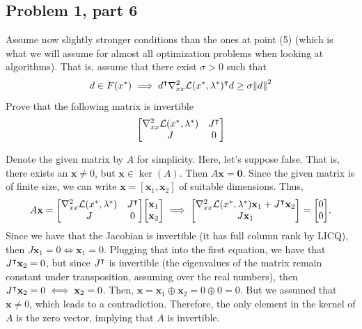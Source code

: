 \subsection{Problem 1, part 6}
Assume now slightly stronger conditions than the ones at point (5) (which is what we will assume for almost all optimization problems when looking at algorithms). That is, assume that there exist $\sigma > 0$ such that
\[d \in F(x^{*}) \implies d^{\intercal} \nabla^2_{xx}\mathcal{L}(x^{*}, \mathrm{\lambda}^{*})^{\intercal} d \geq \sigma\norm{d}^2\]
Prove that the following matrix is invertible
\[\mqty[\grad^2_{xx}\scL(x\star, \lm\star) &J\T\\ J&0]\]
\partbreak
\begin{solution}

    Denote the given matrix by $A$ for simplicity. Here, let's suppose false. That is, there exists an $\textbf{x} \neq 0$, but $\textbf{x} \in \ker (A)$. Then $A\textbf{x} = \textbf{0}$. Since the given matrix is of finite size, we can write $\textbf{x} = [\textbf{x}_1, \textbf{x}_2]$ of suitable dimensions. Thus, 
    \[A\textbf{x} = \mqty[\grad^2_{xx}\scL(x\star, \lm\star) &J\T\\ J&0]\mqty[\textbf{x}_1\\\textbf{x}_2] \implies \mqty[\grad^2_{xx}\scL(x\star, \lm\star)\textbf{x}_1 + J\T \textbf{x}_2\\ J\textbf{x}_1] = \mqty[0\\0].\]
    Since we have that the Jacobian is invertible (it has full column rank by LICQ), then $J\textbf{x}_1 = 0 \iff \textbf{x}_1 = 0$. Plugging that into the first equation, we have that $J^{\intercal} \textbf{x}_2 = 0$, but since $J^{\intercal}$ is invertible (the eigenvalues of the matrix remain constant under transposition, assuming over the real numbers), then $J^{\intercal} \textbf{x}_2 = 0 \iff \textbf{x}_2 = 0$. Then, $\textbf{x} = \textbf{x}_1 \oplus \textbf{x}_2 = 0 \oplus 0 = 0$. But we assumed that $\textbf{x} \neq 0$, which leads to a contradiction. Therefore, the only element in the kernel of $A$ is the zero vector, implying that $A$ is invertible.
\end{solution}

\newpage
